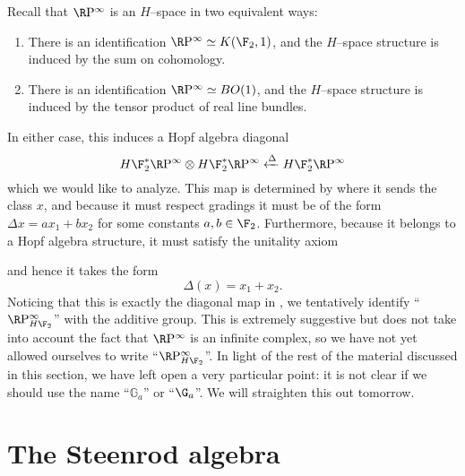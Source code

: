 \begin{example}\label{RPExampleFaulty}
Recall that $\RP^\infty$ is an $H$--space in two equivalent ways:
\begin{enumerate}
\item There is an identification $\RP^\infty \simeq K(\F_2, 1)$, and the $H$--space structure is induced by the sum on cohomology.
\item There is an identification $\RP^\infty \simeq BO(1)$, and the $H$--space structure is induced by the tensor product of real line bundles.
\end{enumerate}
In either case, this induces a Hopf algebra diagonal \[H\F_2^* \RP^\infty \otimes H\F_2^* \RP^\infty \xleftarrow\Delta H\F_2^* \RP^\infty\] which we would like to analyze.  This map is determined by where it sends the class $x$, and because it must respect gradings it must be of the form $\Delta x = ax_1 + bx_2$ for some constants $a, b \in \F_2$.  Furthermore, because it belongs to a Hopf algebra structure, it must satisfy the unitality axiom
\begin{center}
\end{center}
and hence it takes the form \[\Delta(x) = x_1 + x_2.\]  Noticing that this is exactly the diagonal map in , we tentatively identify ``$\RP^\infty_{H\F_2}$'' with the additive group.  This is extremely suggestive but does not take into account the fact that $\RP^\infty$ is an infinite complex, so we have not yet allowed ourselves to write ``$\RP^\infty_{H\F_2}$''.  In light of the rest of the material discussed in this section, we have left open a very particular point: it is not clear if we should use the name ``$\mathbb G_a$'' or ``$\G_a$''.  We will straighten this out tomorrow.
\end{example}








\section{The Steenrod algebra}\label{TheSteenrodAlgebraSection}

